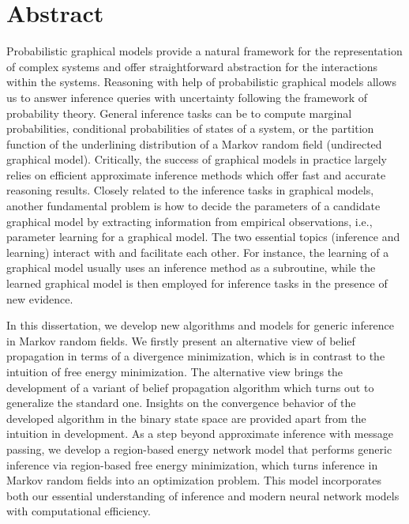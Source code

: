 \chapter{Abstract}
Probabilistic graphical models provide a natural framework for the representation of complex systems and offer straightforward abstraction for the interactions within the systems. Reasoning with help of probabilistic graphical models allows us to answer inference queries with uncertainty following the framework of probability theory. General inference tasks can be to compute marginal probabilities, conditional probabilities of states of a system, or the partition function of the underlining distribution of a Markov random field (undirected graphical model). Critically, the success of graphical models in practice largely relies on efficient approximate inference methods which offer fast and accurate reasoning results. Closely related to the inference tasks in graphical models, another fundamental problem is how to decide the parameters of a candidate graphical model by extracting information from empirical observations, i.e., parameter learning for a graphical model. The two essential topics (inference and learning) interact with and facilitate each other. For instance, the learning of a graphical model usually uses an inference method as a subroutine, while the learned graphical model is then employed for inference tasks in the presence of new evidence.

In this dissertation, we develop new algorithms and models for generic inference in Markov random fields. We firstly present an alternative view of belief propagation in terms of a divergence minimization, which is in contrast to the intuition of free energy minimization. The alternative view brings the development of a variant of belief propagation algorithm which turns out to generalize the standard one. Insights on the convergence behavior of the developed algorithm in the binary state space are provided apart from the intuition in development. As a step beyond approximate inference with message passing, we develop a region-based energy network model that performs generic inference via region-based free energy minimization, which turns inference in Markov random fields into an optimization problem. This model incorporates both our essential understanding of inference and modern neural network models with computational efficiency.


